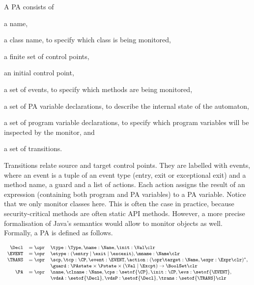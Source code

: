 A PA consists of
\begin{inparaenum}
\item a name,
\item a class name, to specify which class is being monitored,
\item a finite set of control points,
\item an initial control point,
\item a set of events, to specify which methods are being monitored,
\item a set of PA variable declarations, to describe
the internal state of the automaton,
\item a set of program variable declarations, to specify which
program variables will be inspected by the monitor, and
\item a set of transitions.
\end{inparaenum}
Transitions relate source and target control points. They are labelled
with events, where an event is a tuple of an event type (entry, exit
or exceptional exit) and a method name, a guard and a list of
actions. Each action assigns the result of an expression (containing
both program and PA variables) to a PA
variable. Notice that we only monitor classes here. This is often
the case in practice, because security-critical methods are often
static API methods. However, a more precise formalisation of Java's semantics
would allow to monitor objects as well. Formally, a PA is defined as follows.

\vspace*{-1em}
\[{\small
\begin{array}{rcl}
\Decl & = \opr & \type : \Type, \name : \Name, \init : \Val
\clr \\
\EVENT & = \opr & \etype : (\entry \mid \exit \mid \excexit),
                 \mname : \Name \clr\\
\TRANS & = \opr & \scp, \tcp : \CP, \event : \EVENT, \action : (\opr \target : \Name, \expr : \Expr \clr)^*, \\
& &
\guard : \PAstate \times \Pstate \times (\Val \mid \Excpt) \rightarrow \BoolSet\clr\\
\PA & = \opr & \name, \clname : \Name, \cps : \setof{\CP},
            \init : \CP, \evs : \setof{\EVENT},\\
     &   &  \vdsA : \setof{\Decl}, \vdsP : \setof{\Decl},
            \trans : \setof{\TRANS} \clr
\end{array}}
\]

